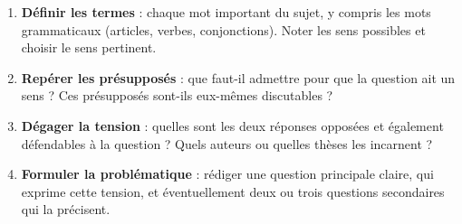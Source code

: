 \documentclass[11pt]{article}
\begin{document}
\begin{methode}
\begin{enumerate}
\item \textbf{Définir les termes} : chaque mot important du sujet, y compris les mots grammaticaux (articles, verbes, conjonctions). Noter les sens possibles et choisir le sens pertinent.
\item \textbf{Repérer les présupposés} : que faut-il admettre pour que la question ait un sens ? Ces présupposés sont-ils eux-mêmes discutables ?
\item \textbf{Dégager la tension} : quelles sont les deux réponses opposées et également défendables à la question ? Quels auteurs ou quelles thèses les incarnent ?
\item \textbf{Formuler la problématique} : rédiger une question principale claire, qui exprime cette tension, et éventuellement deux ou trois questions secondaires qui la précisent.
\end{enumerate}
\end{methode}
\end{document}
